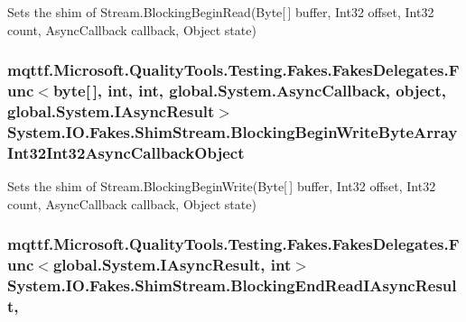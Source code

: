 Sets the shim of Stream.\-Blocking\-Begin\-Read(\-Byte\mbox{[}$\,$\mbox{]} buffer, Int32 offset, Int32 count, Async\-Callback callback, Object state)

\hypertarget{class_system_1_1_i_o_1_1_fakes_1_1_shim_stream_a09da5c6c1a4e8d9bc9e2c88b9a618af1}{
\subsubsection[{Blocking\-Begin\-Write\-Byte\-Array\-Int32\-Int32\-Async\-Callback\-Object}]{\setlength{\rightskip}{0pt plus 5cm}mqttf.\-Microsoft.\-Quality\-Tools.\-Testing.\-Fakes.\-Fakes\-Delegates.\-Func$<$byte\mbox{[}$\,$\mbox{]}, int, int, global.\-System.\-Async\-Callback, object, global.\-System.\-I\-Async\-Result$>$ System.\-I\-O.\-Fakes.\-Shim\-Stream.\-Blocking\-Begin\-Write\-Byte\-Array\-Int32\-Int32\-Async\-Callback\-Object\hspace{0.3cm}{\ttfamily [set]}}}\label{class_system_1_1_i_o_1_1_fakes_1_1_shim_stream_a09da5c6c1a4e8d9bc9e2c88b9a618af1}


Sets the shim of Stream.\-Blocking\-Begin\-Write(\-Byte\mbox{[}$\,$\mbox{]} buffer, Int32 offset, Int32 count, Async\-Callback callback, Object state)

\hypertarget{class_system_1_1_i_o_1_1_fakes_1_1_shim_stream_aee49881f5d1709cbed0cca7865b98df6}{
\subsubsection[{Blocking\-End\-Read\-I\-Async\-Result}]{\setlength{\rightskip}{0pt plus 5cm}mqttf.\-Microsoft.\-Quality\-Tools.\-Testing.\-Fakes.\-Fakes\-Delegates.\-Func$<$global.\-System.\-I\-Async\-Result, int$>$ System.\-I\-O.\-Fakes.\-Shim\-Stream.\-Blocking\-End\-Read\-I\-Async\-Result\hspace{0.3cm}{\ttfamily [static]}, {\ttfamily [set]}}}\label{class_system_1_1_i_o_1_1_fakes_1_1_shim_stream_aee49881f5d1709cbed0cca7865b98df6}



